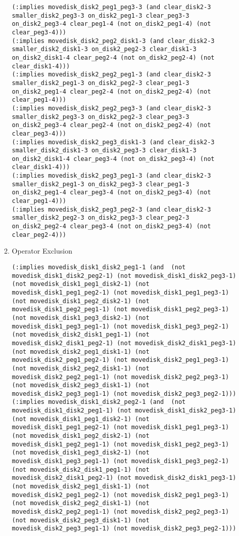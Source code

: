 \documentclass[12pt,letterpaper]{ntdhw}
\begin{document}
\begin{enumerate}
\begin{enumerate}
\begin{lstlisting}[language=pddl, style=pddlstyle,
  basicstyle=\scriptsize]
(:implies movedisk_disk2_peg1_peg3-3 (and clear_disk2-3 smaller_disk2_peg3-3 on_disk2_peg1-3 clear_peg3-3 on_disk2_peg3-4 clear_peg1-4 (not on_disk2_peg1-4) (not clear_peg3-4)))
(:implies movedisk_disk2_peg2_disk1-3 (and clear_disk2-3 smaller_disk2_disk1-3 on_disk2_peg2-3 clear_disk1-3 on_disk2_disk1-4 clear_peg2-4 (not on_disk2_peg2-4) (not clear_disk1-4)))
(:implies movedisk_disk2_peg2_peg1-3 (and clear_disk2-3 smaller_disk2_peg1-3 on_disk2_peg2-3 clear_peg1-3 on_disk2_peg1-4 clear_peg2-4 (not on_disk2_peg2-4) (not clear_peg1-4)))
(:implies movedisk_disk2_peg2_peg3-3 (and clear_disk2-3 smaller_disk2_peg3-3 on_disk2_peg2-3 clear_peg3-3 on_disk2_peg3-4 clear_peg2-4 (not on_disk2_peg2-4) (not clear_peg3-4)))
(:implies movedisk_disk2_peg3_disk1-3 (and clear_disk2-3 smaller_disk2_disk1-3 on_disk2_peg3-3 clear_disk1-3 on_disk2_disk1-4 clear_peg3-4 (not on_disk2_peg3-4) (not clear_disk1-4)))
(:implies movedisk_disk2_peg3_peg1-3 (and clear_disk2-3 smaller_disk2_peg1-3 on_disk2_peg3-3 clear_peg1-3 on_disk2_peg1-4 clear_peg3-4 (not on_disk2_peg3-4) (not clear_peg1-4)))
(:implies movedisk_disk2_peg3_peg2-3 (and clear_disk2-3 smaller_disk2_peg2-3 on_disk2_peg3-3 clear_peg2-3 on_disk2_peg2-4 clear_peg3-4 (not on_disk2_peg3-4) (not clear_peg2-4)))
  \end{lstlisting}
        \item Operator Exclusion
        \begin{lstlisting}[language=pddl, style=pddlstyle,
  basicstyle=\scriptsize]
(:implies movedisk_disk1_disk2_peg1-1 (and  (not movedisk_disk1_disk2_peg2-1) (not movedisk_disk1_disk2_peg3-1) (not movedisk_disk1_peg1_disk2-1) (not movedisk_disk1_peg1_peg2-1) (not movedisk_disk1_peg1_peg3-1) (not movedisk_disk1_peg2_disk2-1) (not movedisk_disk1_peg2_peg1-1) (not movedisk_disk1_peg2_peg3-1) (not movedisk_disk1_peg3_disk2-1) (not movedisk_disk1_peg3_peg1-1) (not movedisk_disk1_peg3_peg2-1) (not movedisk_disk2_disk1_peg1-1) (not movedisk_disk2_disk1_peg2-1) (not movedisk_disk2_disk1_peg3-1) (not movedisk_disk2_peg1_disk1-1) (not movedisk_disk2_peg1_peg2-1) (not movedisk_disk2_peg1_peg3-1) (not movedisk_disk2_peg2_disk1-1) (not movedisk_disk2_peg2_peg1-1) (not movedisk_disk2_peg2_peg3-1) (not movedisk_disk2_peg3_disk1-1) (not movedisk_disk2_peg3_peg1-1) (not movedisk_disk2_peg3_peg2-1)))
(:implies movedisk_disk1_disk2_peg2-1 (and  (not movedisk_disk1_disk2_peg1-1) (not movedisk_disk1_disk2_peg3-1) (not movedisk_disk1_peg1_disk2-1) (not movedisk_disk1_peg1_peg2-1) (not movedisk_disk1_peg1_peg3-1) (not movedisk_disk1_peg2_disk2-1) (not movedisk_disk1_peg2_peg1-1) (not movedisk_disk1_peg2_peg3-1) (not movedisk_disk1_peg3_disk2-1) (not movedisk_disk1_peg3_peg1-1) (not movedisk_disk1_peg3_peg2-1) (not movedisk_disk2_disk1_peg1-1) (not movedisk_disk2_disk1_peg2-1) (not movedisk_disk2_disk1_peg3-1) (not movedisk_disk2_peg1_disk1-1) (not movedisk_disk2_peg1_peg2-1) (not movedisk_disk2_peg1_peg3-1) (not movedisk_disk2_peg2_disk1-1) (not movedisk_disk2_peg2_peg1-1) (not movedisk_disk2_peg2_peg3-1) (not movedisk_disk2_peg3_disk1-1) (not movedisk_disk2_peg3_peg1-1) (not movedisk_disk2_peg3_peg2-1)))

\end{lstlisting}
\end{enumerate}
\end{enumerate}
\end{document}
